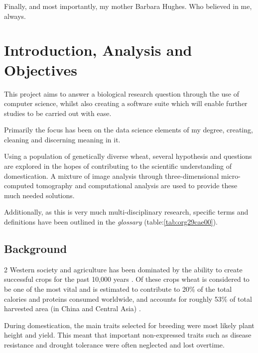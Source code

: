 \documentclass[11pt]{report}
\begin{document}
\vspace{1cm}

Finally, and most importantly, my mother Barbara Hughes. Who believed in me, always.



  \clearpage
  \tableofcontents
  \clearpage
  \listoftables
  \clearpage
  \listoffigures
  \clearpage
  \listofmyequations
  \clearpage
  \listoflistings
  \clearpage

\chapter{Introduction, Analysis and Objectives}
\label{sec:org5ce95e7}

This project aims to answer a biological research question through the use of computer science, whilst also creating a software suite which will enable further studies to be carried out with ease.

Primarily the focus has been on the data science elements of my degree, creating, cleaning and discerning meaning in it.

Using a population of genetically diverse wheat, several hypothesis and questions are explored in the hopes of contributing to the scientific understanding of domestication. A mixture of image analysis through three-dimensional micro-computed tomography and computational analysis are used to provide these much needed solutions.

Additionally, as this is very much multi-disciplinary research, specific terms and definitions have been outlined in the \emph{glossary} (table:\ref{tab:org29cae00}).

\section{Background}
\label{sec:org2effac3}
2
   Western society and agriculture has been dominated by the ability to create successful crops for the past 10,000 years \cite{Ozkan2002}. Of these crops wheat is considered to be one of the most vital and is estimated to contribute to 20\% of the total calories and proteins consumed worldwide, and accounts for roughly 53\% of total harvested area (in China and Central Asia) \cite{Shiferaw2013}.

During domestication, the main traits selected for breeding were most likely plant height and yield. This meant that important non-expressed traits such as disease resistance and drought tolerance were often neglected and lost overtime.
\end{document}
